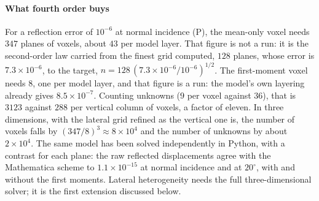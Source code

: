 \documentclass[preprint,review,12pt]{elsarticle}
\begin{document}
\paragraph{What fourth order buys} For a reflection error of $10^{-6}$ at normal incidence (P), the
mean-only voxel needs $347$ planes of voxels, about $43$ per model layer. That figure is not a run: it
is the second-order law carried from the finest grid computed, $128$ planes, whose error is
$7.3\times10^{-6}$, to the target, $n=128\,(7.3\times10^{-6}/10^{-6})^{1/2}$. The first-moment voxel needs
$8$, one per model layer, and that figure is a run: the model's own layering already gives
$8.5\times10^{-7}$. Counting
unknowns ($9$ per voxel against $36$), that is $3123$ against $288$ per vertical column of voxels, a
factor of eleven. In three dimensions, with the lateral grid refined as the vertical one is, the
number of voxels falls by $(347/8)^3\approx8\times10^4$ and the number of unknowns by about $2\times10^4$.
The same model has been solved independently in Python, with a contrast for each plane: the raw
reflected displacements agree with the Mathematica scheme to $1.1\times10^{-15}$ at normal incidence
and at $20^\circ$, with and without the first moments. Lateral
heterogeneity needs the full three-dimensional solver; it is the first extension discussed below.
\end{document}
